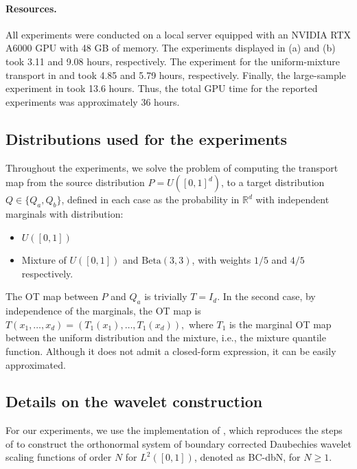 \documentclass{article}
\newcommand{\1}{\mathds{1}}
\theoremstyle{plain}
\theoremstyle{definition}
\theoremstyle{remark}
\begin{document}
\paragraph{Resources.} All experiments were conducted on a local server equipped with an NVIDIA RTX A6000 GPU with 48 GB of memory.
The experiments displayed in (a) and (b) took 3.11 and 9.08 hours, respectively. The experiment for the uniform-mixture transport in  and  took 4.85 and 5.79 hours, respectively. Finally, the large-sample experiment in  took 13.6 hours. Thus, the total GPU time for the reported experiments was approximately 36 hours.




\subsection{Distributions used for the experiments} \label{sec:distr_details}

Throughout the experiments, we solve the problem of computing the transport map from the source distribution $P=U([0,1]^d)$, to a target distribution $Q\in \{Q_a,Q_b\}$, defined in each case as the probability in $\mathbb{R}^d$ with independent marginals with distribution:

\begin{itemize}
    \item[(a)] $U([0,1])$
    \item[(b)] Mixture of $U([0,1])$ and $\text{Beta}(3,3)$, with weights $1/5$ and $4/5$ respectively.
\end{itemize}
The OT map between $P$ and $Q_a$ is trivially $T=I_d$. In the second case, by independence of the marginals, the OT map is
\(
T(x_1,\ldots,x_d) = (T_1(x_1),\ldots,T_1(x_d)),
\)
where $T_1$ is the marginal OT map between the uniform distribution and the mixture, i.e., the mixture quantile function. Although it does not admit a closed-form expression, it can be easily approximated.


\subsection{Details on the wavelet construction}
\label{subsec:wavelet_details}



For our experiments, we use the implementation of \cite{holm2020orthonormal}, which reproduces the steps  of \cite{cohen1993wavelets} to construct the orthonormal system of boundary corrected Daubechies wavelet scaling functions of order $N$ for $L^2([0, 1])$, denoted as BC-dbN, for $N\geq 1$. \\
\end{document}
